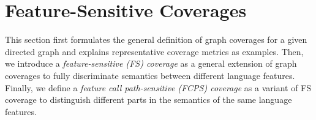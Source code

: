 \section{Feature-Sensitive Coverages}\label{sec:fscov}

This section first formulates the general definition of graph coverages for a
given directed graph and explains representative coverage metrics as examples.
%
Then, we introduce a \textit{feature-sensitive (FS) coverage} as a general
extension of graph coverages to fully discriminate semantics between different
language features.
%
Finally, we define a \textit{feature call path-sensitive (FCPS) coverage} as a
variant of FS coverage to distinguish different parts in the semantics of the
same language features.




